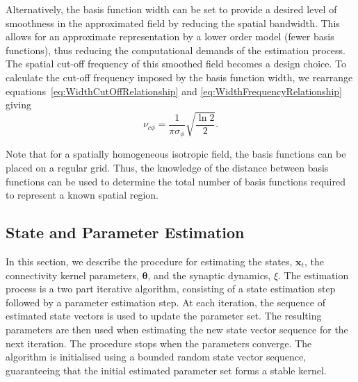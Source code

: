 \documentclass[10pt]{article}
\begin{document}
Alternatively, the basis function width can be set to provide a desired level of smoothness in the approximated field by reducing the spatial bandwidth. This allows for an approximate representation by a lower order model (fewer basis functions), thus reducing the computational demands of the estimation process. The spatial cut-off frequency of this smoothed field becomes a design choice. To calculate the cut-off frequency imposed by the basis function width, we rearrange equations~\ref{eq:WidthCutOffRelationship} and \ref{eq:WidthFrequencyRelationship} giving
\begin{equation}\label{eq:CutoffFromBasisFuncWidth}
	\nu_{c\phi}=\frac{1}{\pi\sigma_{\phi}}\sqrt{\frac{\ln2}{2}}.
\end{equation} 

Note that for a spatially homogeneous isotropic field, the basis functions can be placed on a regular grid. Thus, the knowledge of the distance between basis functions can be used to determine the total number of basis functions required to represent a known spatial region.

\subsection*{State and Parameter Estimation}\label{StateAndParameterEstimationSection} In this section, we describe the procedure for estimating the states, $\mathbf{x}_t$, the connectivity kernel parameters, $\boldsymbol \theta$, and the synaptic dynamics, $\xi$. The estimation process is a two part iterative algorithm, consisting of a state estimation step followed by a parameter estimation step. At each iteration, the sequence of estimated state vectors is used to update the parameter set. The resulting parameters are then used when estimating the new state vector sequence for the next iteration. The procedure stops when the parameters converge. The algorithm is initialised using a bounded random state vector sequence, guaranteeing that the initial estimated parameter set forms a stable kernel.
\end{document}
